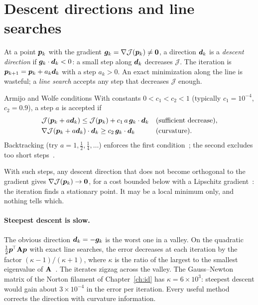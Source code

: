 \section{Descent directions and line searches}\label{sec:opt-descent}
%
At a point $\bm{p}_k$ with the gradient $\bm{g}_k=\nabla\mathcal J(\bm{p}_k)\neq\bm{0}$, a
direction $\bm{d}_k$ is a \emph{descent direction} if $\bm{g}_k\cdot\bm{d}_k<0$: a small
step along $\bm{d}_k$ decreases $\mathcal J$. The iteration is
$\bm{p}_{k+1}=\bm{p}_k+a_k\bm{d}_k$ with a step $a_k>0$. An exact minimization along the
line is wasteful; a \emph{line search} accepts any step that decreases $\mathcal J$
enough.
\begin{gbox}{Armijo and Wolfe conditions}\label{def:opt-wolfe}
%
With constants $0<c_1<c_2<1$ (typically $c_1=10^{-4}$, $c_2=0.9$), a step $a$ is
accepted if
\begin{equation}\label{eq:opt-wolfe}
\begin{aligned}
  &\mathcal J(\bm{p}_k+a\bm{d}_k)\le\mathcal J(\bm{p}_k)+c_1\,a\,\bm{g}_k\cdot\bm{d}_k
  &&\text{(sufficient decrease)},\\
  &\nabla\mathcal J(\bm{p}_k+a\bm{d}_k)\cdot\bm{d}_k\ge c_2\,\bm{g}_k\cdot\bm{d}_k
  &&\text{(curvature)}.
\end{aligned}
\end{equation}
Backtracking (try $a=1,\tfrac12,\tfrac14,\dots$) enforces the first
condition~\cite{Armijo1966}; the second excludes too short
steps~\cite{Wolfe1969}.
\end{gbox}
\noindent With such steps, any descent direction that does not become orthogonal
to the gradient gives $\nabla\mathcal J(\bm{p}_k)\to\bm{0}$, for a cost bounded below
with a Lipschitz gradient~\cite[Sec.~3.2]{NocedalWright2006b}: the iteration
finds a stationary point. It may be a local minimum only, and nothing tells which.

\paragraph{Steepest descent is slow.}
%
The obvious direction $\bm{d}_k=-\bm{g}_k$ is the worst one in a valley. On the
quadratic $\tfrac12\bm{p}^{\!\top}\mathbf{A}\bm{p}$ with exact line searches, the error decreases at
each iteration by the factor $(\kappa-1)/(\kappa+1)$, where $\kappa$ is the ratio of
the largest to the smallest eigenvalue of $\mathbf{A}$~\cite[Sec.~3.3]{NocedalWright2006b}.
The iterates zigzag across the valley. The Gauss--Newton matrix of the Norton
filament of Chapter~\ref{ch:id} has $\kappa=6\times10^3$: steepest descent would gain
about $3\times10^{-4}$ in the error per iteration. Every useful method corrects
the direction with curvature information.


